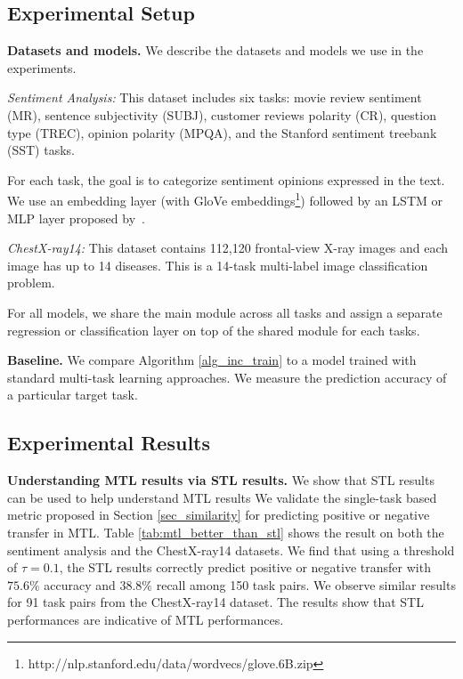 \subsection{Experimental Setup}

{\bf Datasets and models.} We describe the datasets and models we use in the experiments.

{\it Sentiment Analysis:} This dataset includes six tasks: movie review sentiment (MR), sentence subjectivity (SUBJ), customer reviews polarity (CR), question type (TREC), opinion polarity (MPQA), and the Stanford sentiment treebank (SST) tasks.

{For each task, the goal is to categorize sentiment opinions expressed in the text.
We use an embedding layer (with GloVe embeddings\footnote{http://nlp.stanford.edu/data/wordvecs/glove.6B.zip}) followed by an LSTM or MLP layer proposed by~\cite{lei2018simple}.
}

{\it ChestX-ray14:} This dataset contains 112,120 frontal-view X-ray images and each image has up to 14 diseases.
This is a 14-task multi-label image classification problem.

For all models, we share the main module across all tasks and assign a separate regression or classification layer on top of the shared module for each tasks.

\textbf{Baseline.} We compare Algorithm \ref{alg_inc_train} to a model trained with standard multi-task learning approaches.
We measure the prediction accuracy of a particular target task.


\subsection{Experimental Results}

\textbf{Understanding MTL results via STL results.}
We show that STL results can be used to help understand MTL results
We validate the single-task based metric proposed in Section \ref{sec_similarity} for predicting positive or negative transfer in MTL.
Table \ref{tab:mtl_better_than_stl} shows the result on both the sentiment analysis and the ChestX-ray14 datasets.
We find that using a threshold of $\tau = 0.1$, the STL results correctly predict positive or negative transfer with $75.6\%$ accuracy and $38.8\%$ recall among 150 task pairs.
We observe similar results for 91 task pairs from the ChestX-ray14 dataset.
The results show that STL performances are indicative of MTL performances.

